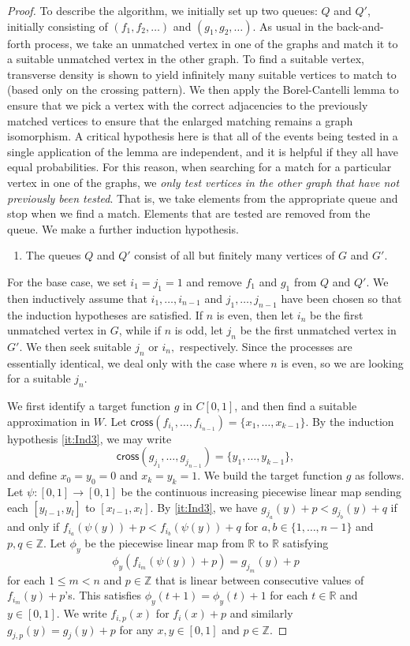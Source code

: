 \documentclass{daj}
\newcommand{\R}{\mathbb R}
\newcommand{\Z}{\mathbb Z}
\newcommand{\cross}{\mathsf{cross}}
\begin{document}
\begin{proof}
To describe the algorithm, we initially set up two queues: $Q$ and $Q'$,
initially consisting of $(f_1,f_2,\ldots)$
and $(g_1,g_2,\ldots)$. As usual in the back-and-forth process, we take an unmatched
vertex in one of the graphs and match it to a suitable unmatched vertex in the other graph. To find
a suitable vertex, transverse density is shown to yield infinitely many suitable vertices to match to (based
only on the crossing pattern). We then apply
the Borel-Cantelli lemma to ensure that we pick a vertex with the correct adjacencies to the
previously matched vertices to ensure that the enlarged matching remains a graph isomorphism.
A critical hypothesis here is that all of the
events being tested in a single application of the lemma are independent, and it is helpful if they
all have equal probabilities. For this reason, when searching for a match for a particular vertex
in one of the graphs, we \emph{only test vertices in the other graph that have not previously been tested}.
That is, we take elements from the appropriate queue and stop when we find a match.
Elements that are tested are removed from the queue.
We make a further induction hypothesis.
\begin{enumerate}[resume*]
\item The queues $Q$ and $Q'$ consist of all but finitely many vertices of $G$ and $G'$.
\end{enumerate}

For the base case, we set $i_1=j_1=1$ and remove $f_1$ and $g_1$ from $Q$ and $Q'$.
We then inductively assume that
$i_1,\ldots, i_{n-1}$ and $j_1,\ldots,j_{n-1}$ have been chosen so that
the induction hypotheses are satisfied.
If $n$ is even, then let $i_n$ be the first unmatched vertex in $G$,
while if $n$ is odd, let $j_n$ be the first unmatched vertex
in $G'$. We then seek suitable $j_n$ or $i_n,$ respectively. Since the processes are essentially
identical, we deal only with the case where
$n$ is even, so we are looking for a suitable $j_n$.

We first identify a target function $g$ in $C[0,1]$, and then find a suitable approximation in $W$.
Let $\cross(f_{i_1},\ldots,f_{i_{n-1}})=\{x_1,\ldots,x_{k-1}\}$.
By the induction hypothesis \ref{it:Ind3}, we may
write  $$\cross(g_{j_1},\ldots,g_{j_{n-1}})=\{y_1,\ldots,y_{k-1}\},$$
and define $x_0=y_0=0$ and $x_k=y_k=1$.
We build the target function $g$ as follows. Let $\psi\colon[0,1]\to[0,1]$
be the continuous increasing piecewise linear map
sending each $[y_{l-1},y_l]$ to $[x_{l-1},x_l]$.
By \ref{it:Ind3}, we have $g_{j_a}(y)+p<g_{j_b}(y)+q$ if and only if $f_{i_a}(\psi(y))+p<f_{i_b}(\psi(y))+q$
for $a,b\in \{1,\ldots,n-1\}$ and $p,q\in\Z$.
Let $\phi_y$ be the piecewise linear map from $\R$ to $\R$ satisfying
\begin{equation}\label{eq:phidef}
\phi_y(f_{i_m}(\psi(y))+p)=g_{j_m}(y)+p
\end{equation}
for each $1\le m< n$ and $p\in\Z$ that is linear between consecutive
values of $f_{i_m}(y)+p$'s. This satisfies
$\phi_y(t+1)=\phi_y(t)+1$ for each $t\in\R$ and $y\in[0,1]$.
We write $f_{i,p}(x)$ for $f_i(x)+p$ and similarly $g_{j,p}(y)=g_j(y)+p$
for any $x,y\in[0,1]$ and $p\in\Z$.


\end{proof}
\end{document}
